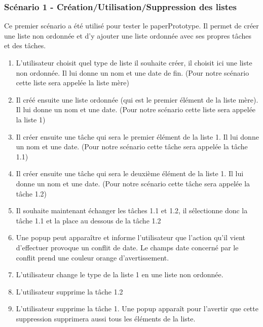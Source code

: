 \documentclass[a4paper,10pt]{article}
\begin{document}
\subsubsection{Scénario 1 - Création/Utilisation/Suppression des listes}
Ce premier scénario a été utilisé pour tester le paperPrototype. Il permet de créer une liste non ordonnée et d'y ajouter une liste ordonnée avec ses propres tâches et des tâches.
\begin{enumerate}
\item{L'utilisateur choisit quel type de liste il souhaite créer, il choisit ici une liste non ordonnée. Il lui donne un nom et une date de fin. (Pour notre scénario cette liste sera appelée la liste mère)}
\item{Il créé ensuite une liste ordonnée (qui est le premier élément de la liste mère). Il lui donne un nom et une date. (Pour notre scénario cette liste sera appelée la liste 1)}
\item{Il créer ensuite une tâche qui sera le premier élément de la liste 1. Il lui donne un nom et une date. (Pour notre scénario cette tâche sera appelée la tâche 1.1)}
\item{Il créer ensuite une tâche qui sera le deuxième élément de la liste 1. Il lui donne un nom et une date. (Pour notre scénario cette tâche sera appelée la tâche 1.2)}
\item{Il souhaite maintenant échanger les tâches 1.1 et 1.2, il sélectionne donc la tâche 1.1 et la place au dessous de la tâche 1.2}
\item{Une popup peut apparaître et informe l'utilisateur que l'action qu'il vient d'effectuer provoque un conflit de date. Le champs date concerné par le conflit prend une couleur orange d'avertissement.}
\item{L'utilisateur change le type de la liste 1 en une liste non ordonnée.}
\item{L'utilisateur supprime la tâche 1.2}
\item{L'utilisateur supprime la tâche 1. Une popup apparaît pour l'avertir que cette suppression supprimera aussi tous les éléments de la liste.}
\end{enumerate}
\end{document}

